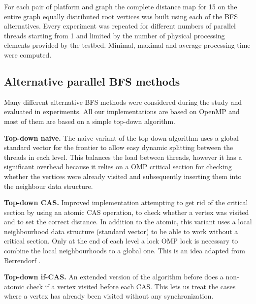 \documentclass[letterpaper]{article}
\newcommand{\mypar}[1]{{\bf #1.}} %
\begin{document}
		For each pair of platform and graph the complete distance map for 15 on the entire graph equally distributed root vertices was built using each of the BFS alternatives.
		Every experiment was repeated for different numbers of parallel threads starting from 1 and limited by the number of physical processing elements provided by the testbed.
		Minimal, maximal and average processing time were computed.
		
		\subsection{Alternative parallel BFS methods}\label{sec:approaches}
		Many different alternative BFS methods were considered during the study and evaluated in experiments.
		All our implementations are based on OpenMP and most of them are based on a simple top-down algorithm. 

		\mypar{Top-down naive}
		The naive variant of the top-down algorithm uses a global standard vector for the frontier to allow easy dynamic splitting between the threads in each level. 
		This balances the load between threads, however it has a significant overhead because it relies on a OMP critical section for checking whether the vertices were already visited and subsequently inserting them into the neighbour data structure.

		\mypar{Top-down CAS}
		Improved implementation attempting to get rid of the critical section by using an atomic CAS operation, to check whether a vertex was visited and to set the correct distance. 
		In addition to the atomic, this variant uses a local neighbourhood data structure (standard vector) to be able to work without a critical section. 
		Only at the end of each level a lock OMP lock is necessary to combine the local neighbourhoods to a global one. 
		This is an idea adapted from Berrendorf \cite{Berrendorf:14}.
		
		\mypar{Top-down if-CAS}
		An extended version of the algorithm before does a non-atomic check if a vertex visited before each CAS. 
		This lets us treat the cases where a vertex has already been visited without any synchronization.
\end{document}
